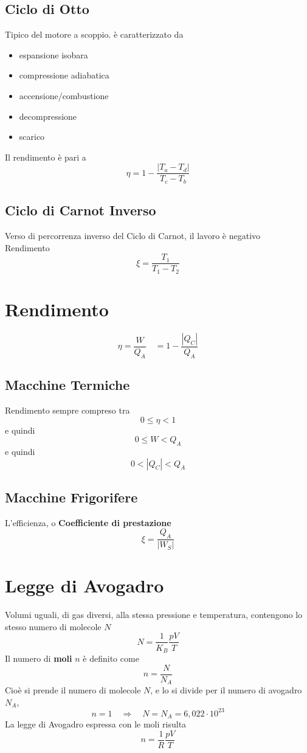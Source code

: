 \documentclass[a4paper]{report}
\begin{document}
  \subsection{Ciclo di Otto}
  Tipico del motore a scoppio. è caratterizzato da
  \begin{itemize}
    \item espansione isobara
    \item compressione adiabatica
    \item accensione/combustione
    \item decompressione
    \item scarico
  \end{itemize}
  Il rendimento è pari a
  \[ \eta = 1 - \frac{|T_a - T_d|}{T_c - T_b} \]

  \subsection{Ciclo di Carnot Inverso}
  Verso di percorrenza inverso del Ciclo di Carnot, il lavoro è negativo \\
  Rendimento
  \[ \xi = \frac{T_1}{T_1 - T_2} \]

  \section{Rendimento}
  \[ \eta=\frac{W}{Q_A} \quad = 1- \frac{|Q_C|}{Q_A}\]
  \subsection{Macchine Termiche}
  Rendimento sempre compreso tra
  \[0 \leq \eta < 1\]
  e quindi
  \[0 \leq W < Q_A \]
  e quindi
  \[ 0 < |Q_C| < Q_A \]
  \subsection {Macchine Frigorifere}
  L'efficienza, o \textbf{Coefficiente di prestazione}
  \[ \xi = \frac{Q_A}{|W_S|}  \]

  \section{Legge di Avogadro}
  Volumi uguali, di gas diversi, alla stessa pressione e temperatura, contengono lo stesso numero di molecole $N$
  \[ N = \frac{1}{K_B} \frac{pV}{T} \]
  Il numero di \textbf{moli} $n$ è definito come
  \[ n = \frac{N}{N_A} \]
  Cioè si prende il numero di molecole $N$, e lo si divide per il numero di avogadro $N_A$,
  \[ n = 1 \quad \Rightarrow \quad N = N_A = 6,022 \cdot 10^{23}\]
  La legge di Avogadro espressa con le moli risulta
  \[ n = \frac{1}{R} \frac{pV}{T} \]
\end{document}
